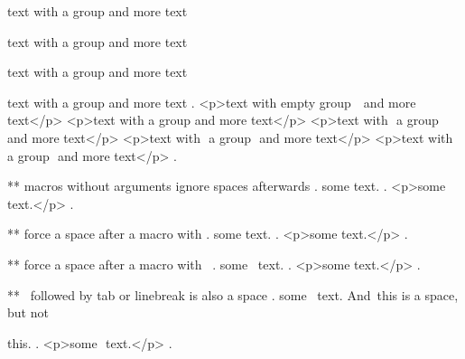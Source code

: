 text with {a group} and more text

text with { a group } and more text

text with { a group  } and more text

text with {  a group  }  and more text
.
<p>text with empty group ​ ​ and more text</p>
<p>text with a group​ and more text</p>
<p>text with ​ a group ​ and more text</p>
<p>text with ​ a group ​ and more text</p>
<p>text with ​ a group ​ and more text</p>
.


** macros without arguments ignore spaces afterwards
.
some \echo  text.
.
<p>some text.</p>
.


** force a space after a macro with {}
.
some \echo{} text.
.
<p>some ​ text.</p>
.


** force a space after a macro with \
.
some \echo\ text.
.
<p>some ​ text.</p>
.


** \ followed by tab or linebreak is also a space
.
some \echo\
text. And\	this is a space, but not\

this.
.
<p>some ​ text.</p>
.
